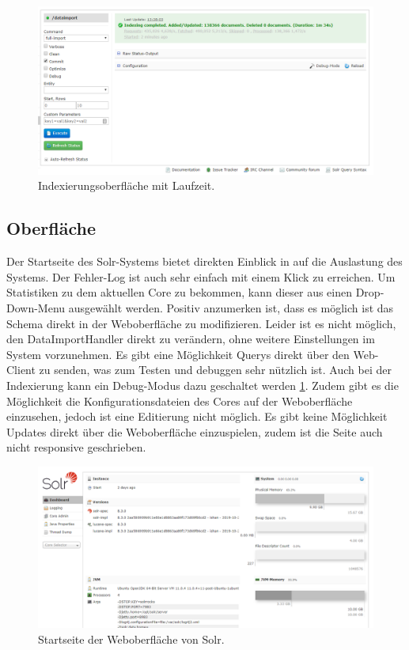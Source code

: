 \begin{figure}
	\centering
	\includegraphics[width=1\linewidth]{images/solr_indexing_time.png}
	\caption{Indexierungsoberfläche mit Laufzeit.}
	\label{img:solrIndexTime}
\end{figure}

\subsection{Oberfläche}

Der Startseite des Solr-Systems bietet direkten Einblick in auf die Auslastung des Systems. Der Fehler-Log ist auch sehr einfach mit einem Klick zu erreichen. Um Statistiken zu dem aktuellen Core zu bekommen, kann dieser aus einen Drop-Down-Menu ausgewählt werden. Positiv anzumerken ist, dass es möglich ist das Schema direkt in der Weboberfläche zu modifizieren. Leider ist es nicht möglich, den DataImportHandler direkt zu verändern, ohne weitere Einstellungen im System vorzunehmen. Es gibt eine Möglichkeit Querys direkt über den Web-Client zu senden, was zum Testen und debuggen sehr nützlich ist. Auch bei der Indexierung kann ein Debug-Modus dazu geschaltet werden \ref{img:solrIndexTime}. Zudem gibt es die Möglichkeit die Konfigurationsdateien des Cores auf der Weboberfläche einzusehen, jedoch ist eine Editierung nicht möglich.
Es gibt keine Möglichkeit Updates direkt über die Weboberfläche einzuspielen, zudem ist die Seite auch nicht responsive geschrieben. 

\begin{figure}
	\centering
	\includegraphics[width=1\linewidth]{images/solr_interface.png}
	\caption{Startseite der Weboberfläche von Solr.}
	\label{img:solrInterface}
\end{figure}


